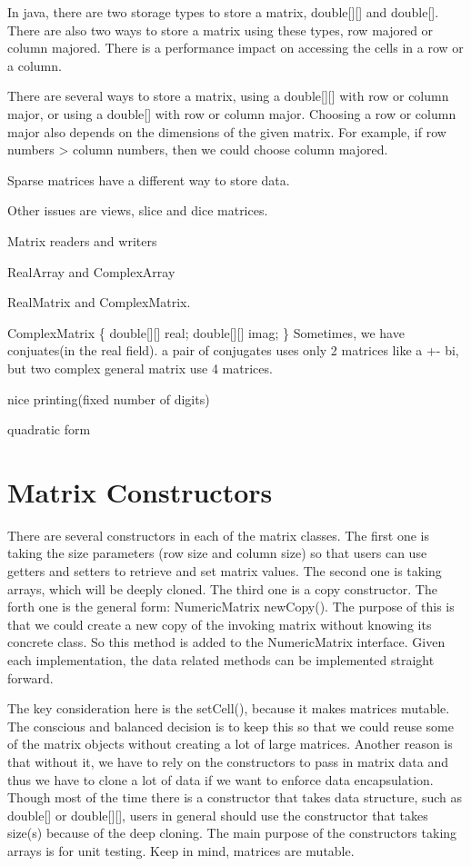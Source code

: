 In java, there are two storage types to store a matrix, double[][] and double[]. There are also two ways to store a matrix using these types, row majored or column majored. There is a performance impact on accessing the cells in a row or a column.

There are several ways to store a matrix, using a double[][] with row or column major, or using a double[] with row or column major. Choosing a row or column major also depends on the dimensions of the given matrix. For example, if row numbers > column numbers, then we could choose column majored.


Sparse matrices have a different way to store data.

Other issues are views, slice and dice matrices.

Matrix readers and writers

RealArray and ComplexArray

RealMatrix and ComplexMatrix.

ComplexMatrix \{ double[][] real; double[][] imag; \}
Sometimes, we have conjuates(in the real field). a pair of conjugates uses only 2 matrices like a +- bi, but two complex general matrix use 4 matrices.

nice printing(fixed number of digits)

quadratic form


\section{Matrix Constructors}
There are several constructors in each of the matrix classes. The first one is taking the size parameters (row size and column size) so that users can use getters and setters to retrieve and set matrix values. The second one is taking arrays, which will be deeply cloned. The third one is a copy constructor. The forth one is the general form: NumericMatrix newCopy(). The purpose of this is that we could create a new copy of the invoking matrix without knowing its concrete class. So this method is added to the NumericMatrix interface. Given each implementation, the data related methods can be implemented straight forward.

The key consideration here is the setCell(), because it makes matrices mutable. The conscious and balanced decision is to keep this so that we could reuse some of the matrix objects without creating a lot of large matrices. Another reason is that without it, we have to rely on the constructors to pass in matrix data and thus we have to clone a lot of data if we want to enforce data encapsulation. Though most of the time there is a constructor that takes data structure, such as double[] or double[][], users in general should use the constructor that takes size(s) because of the deep cloning. The main purpose of the constructors taking arrays is for unit testing. Keep in mind, matrices are mutable.

